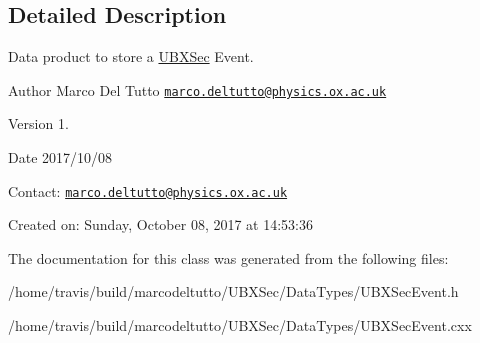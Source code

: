 \subsection{Detailed Description}
Data product to store a \hyperlink{classUBXSec}{U\-B\-X\-Sec} Event. 

\begin{DoxyAuthor}{Author}
Marco Del Tutto \href{mailto:marco.deltutto@physics.ox.ac.uk}{\tt marco.\-deltutto@physics.\-ox.\-ac.\-uk}
\end{DoxyAuthor}
\begin{DoxyVersion}{Version}
1.
\end{DoxyVersion}
\begin{DoxyDate}{Date}
2017/10/08
\end{DoxyDate}
Contact\-: \href{mailto:marco.deltutto@physics.ox.ac.uk}{\tt marco.\-deltutto@physics.\-ox.\-ac.\-uk}

Created on\-: Sunday, October 08, 2017 at 14\-:53\-:36 

The documentation for this class was generated from the following files\-:\begin{DoxyCompactItemize}
\item 
/home/travis/build/marcodeltutto/\-U\-B\-X\-Sec/\-Data\-Types/U\-B\-X\-Sec\-Event.\-h\item 
/home/travis/build/marcodeltutto/\-U\-B\-X\-Sec/\-Data\-Types/U\-B\-X\-Sec\-Event.\-cxx\end{DoxyCompactItemize}
